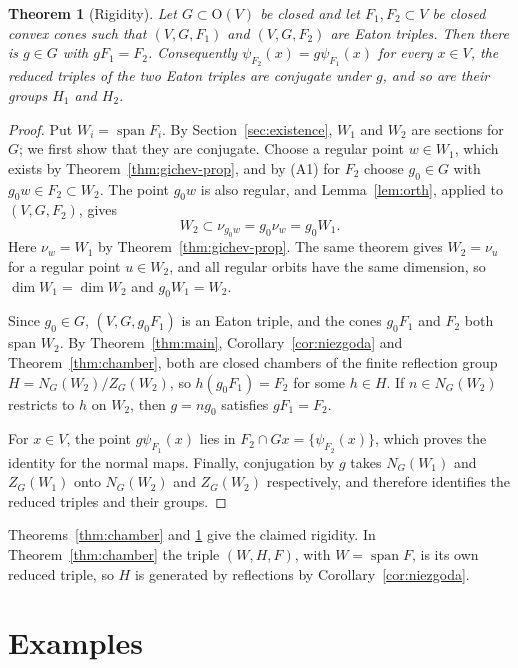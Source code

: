 \documentclass[11pt]{amsart}
\theoremstyle{plain}
\newtheorem{theorem}{Theorem}[section]
\theoremstyle{definition}
\theoremstyle{remark}
\newcommand{\spn}{\operatorname{span}}
\begin{document}
\begin{theorem}[Rigidity]\label{thm:rigidity}
Let $G\subset \mathrm{O}(V)$ be closed and let $F_1,F_2\subset V$ be closed convex cones such that $(V,G,F_1)$ and $(V,G,F_2)$ are Eaton triples. Then there is $g\in G$ with $gF_1=F_2$. Consequently $\psi_{F_2}(x)=g\psi_{F_1}(x)$ for every $x\in V$, the reduced triples of the two Eaton triples are conjugate under $g$, and so are their groups $H_1$ and $H_2$.
\end{theorem}
\begin{proof}
Put $W_i=\spn F_i$. By Section~\ref{sec:existence}, $W_1$ and $W_2$ are sections for $G$; we first show that they are conjugate. Choose a regular point $w\in W_1$, which exists by Theorem~\ref{thm:gichev-prop}, and by (A1) for $F_2$ choose $g_0\in G$ with $g_0w\in F_2\subset W_2$. The point $g_0w$ is also regular, and Lemma~\ref{lem:orth}, applied to $(V,G,F_2)$, gives
\[
W_2\subset\nu_{g_0w}=g_0\nu_w=g_0W_1.
\]
Here $\nu_w=W_1$ by Theorem~\ref{thm:gichev-prop}. The same theorem gives $W_2=\nu_u$ for a regular point $u\in W_2$, and all regular orbits have the same dimension, so $\dim W_1=\dim W_2$ and $g_0W_1=W_2$.

Since $g_0\in G$, $(V,G,g_0F_1)$ is an Eaton triple, and the cones $g_0F_1$ and $F_2$ both span $W_2$. By Theorem~\ref{thm:main}, Corollary~\ref{cor:niezgoda} and Theorem~\ref{thm:chamber}, both are closed chambers of the finite reflection group $H=N_G(W_2)/Z_G(W_2)$, so $h(g_0F_1)=F_2$ for some $h\in H$. If $n\in N_G(W_2)$ restricts to $h$ on $W_2$, then $g=ng_0$ satisfies $gF_1=F_2$.

For $x\in V$, the point $g\psi_{F_1}(x)$ lies in $F_2\cap Gx=\{\psi_{F_2}(x)\}$, which proves the identity for the normal maps. Finally, conjugation by $g$ takes $N_G(W_1)$ and $Z_G(W_1)$ onto $N_G(W_2)$ and $Z_G(W_2)$ respectively, and therefore identifies the reduced triples and their groups.
\end{proof}

Theorems~\ref{thm:chamber} and \ref{thm:rigidity} give the claimed rigidity. In Theorem~\ref{thm:chamber} the triple $(W,H,F)$, with $W=\spn F$, is its own reduced triple, so $H$ is generated by reflections by Corollary~\ref{cor:niezgoda}.

\section{Examples}\label{sec:examples}
\end{document}

